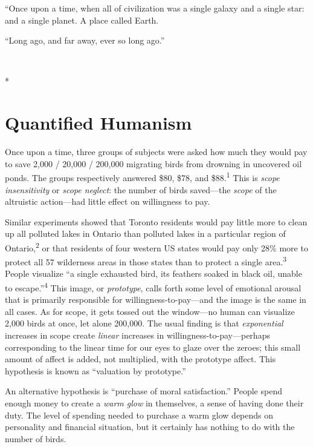 {
 ``Once upon a time, when all of civilization was
a single galaxy and a single star: and a single planet. A place called
Earth.}

{
 ``Long ago, and far away, ever so long
ago.''}

{\centering
 \ ~
\par}

{\centering
 *
\par}

\chapter{Quantified Humanism}


{
 Once upon a time, three groups of subjects were asked how much
they would pay to save 2,000 / 20,000 / 200,000 migrating birds from
drowning in uncovered oil ponds. The groups respectively answered \$80,
\$78, and \$88.\textsuperscript{1} This is \textit{scope insensitivity}
or \textit{scope neglect}: the number of birds saved---the
\textit{scope} of the altruistic action---had little effect on
willingness to pay. }

{
 Similar experiments showed that Toronto residents would pay little
more to clean up all polluted lakes in Ontario than polluted lakes in a
particular region of Ontario,\textsuperscript{2} or that residents of
four western US states would pay only 28\% more to protect all 57
wilderness areas in those states than to protect a single
area.\textsuperscript{3} People visualize ``a single
exhausted bird, its feathers soaked in black oil, unable to
escape.''\textsuperscript{4} This image, or
\textit{prototype}, calls forth some level of emotional arousal that is
primarily responsible for willingness-to-pay---and the image is the
same in all cases. As for scope, it gets tossed out the window---no
human can visualize 2,000 birds at once, let alone 200,000. The usual
finding is that \textit{exponential} increases in scope create
\textit{linear} increases in willingness-to-pay---perhaps corresponding
to the linear time for our eyes to glaze over the zeroes; this small
amount of affect is added, not multiplied, with the prototype affect.
This hypothesis is known as ``valuation by
prototype.''}

{
 An alternative hypothesis is ``purchase of moral
satisfaction.'' People spend enough money to create a
\textit{warm glow} in themselves, a sense of having done their duty.
The level of spending needed to purchase a warm glow depends on
personality and financial situation, but it certainly has nothing to do
with the number of birds.}

